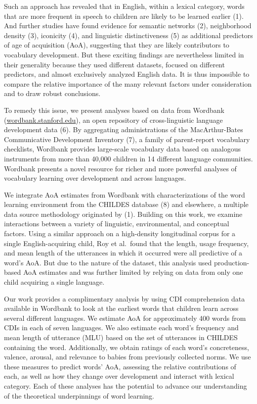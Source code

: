 \documentclass[9pt,twocolumn,twoside]{pnas-new}
\begin{document}
Such an approach has revealed that in English, within a lexical
category, words that are more frequent in speech to children are likely
to be learned earlier (1). And further studies have found evidence for
semantic networks (2), neighborhood density (3), iconicity (4), and
linguistic distinctiveness (5) as additional predictors of age of
acquisition (AoA), suggesting that they are likely contributors to
vocabulary development. But these exciting findings are nevertheless
limited in their generality because they used different datasets,
focused on different predictors, and almost exclusively analyzed English
data. It is thus impossible to compare the relative importance of the
many relevant factors under consideration and to draw robust
conclusions.

To remedy this issue, we present analyses based on data from Wordbank
(\href{http://wordbank.stanford.edu}{wordbank.stanford.edu}), an open
repository of cross-linguistic language development data (6). By
aggregating administrations of the MacArthur-Bates Communicative
Development Inventory (7), a family of parent-report vocabulary
checklists, Wordbank provides large-scale vocabulary data based on
analogous instruments from more than 40,000 children in 14 different
language communities. Wordbank presents a novel resource for richer and
more powerful analyses of vocabulary learning over development and
across languages.

We integrate AoA estimates from Wordbank with characterizations of the
word learning environment from the CHILDES database (8) and elsewhere, a
multiple data source methodology originated by (1). Building on this
work, we examine interactions between a variety of linguistic,
environmental, and conceptual factors. Using a similar approach on a
high-density longitudinal corpus for a single English-acquiring child,
Roy et al.~found that the length, usage frequency, and mean length of
the utterances in which it occurred were all predictive of a word's AoA.
But due to the nature of the dataset, this analysis used
production-based AoA estimates and was further limited by relying on
data from only one child acquiring a single language.

Our work provides a complimentary analysis by using CDI comprehension
data available in Wordbank to look at the earliest words that children
learn across several different languages. We estimate AoA for
approximately 400 words from CDIs in each of seven languages. We also
estimate each word's frequency and mean length of utterance (MLU) based
on the set of utterances in CHILDES containing the word. Additionally,
we obtain ratings of each word's concreteness, valence, arousal, and
relevance to babies from previously collected norms. We use these
measures to predict words' AoA, assessing the relative contributions of
each, as well as how they change over development and interact with
lexical category. Each of these analyses has the potential to advance
our understanding of the theoretical underpinnings of word learning.
\end{document}
